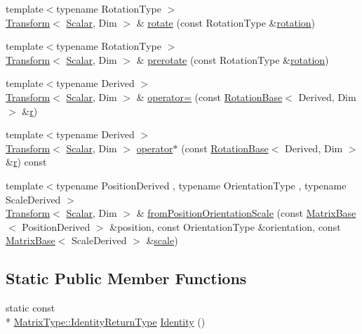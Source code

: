 \begin{DoxyCompactItemize}
\item 
{\footnotesize template$<$typename Rotation\-Type $>$ }\\\hyperlink{class_transform}{Transform}$<$ \hyperlink{class_transform_a0468fefb805493a70f2100c7faf05489}{Scalar}, Dim $>$ \& \hyperlink{class_transform_a28240ba37b1fe2b0b9bb35cd0ab73cf9}{rotate} (const Rotation\-Type \&\hyperlink{class_transform_a3d5324a4905c6c83465ae72afbdcf947}{rotation})
\item 
{\footnotesize template$<$typename Rotation\-Type $>$ }\\\hyperlink{class_transform}{Transform}$<$ \hyperlink{class_transform_a0468fefb805493a70f2100c7faf05489}{Scalar}, Dim $>$ \& \hyperlink{class_transform_a3fc8243a69cae2069870abfa76063024}{prerotate} (const Rotation\-Type \&\hyperlink{class_transform_a3d5324a4905c6c83465ae72afbdcf947}{rotation})
\item 
{\footnotesize template$<$typename Derived $>$ }\\\hyperlink{class_transform}{Transform}$<$ \hyperlink{class_transform_a0468fefb805493a70f2100c7faf05489}{Scalar}, Dim $>$ \& \hyperlink{class_transform_a0de35e40bc02a61ba5e5f22875797f9e}{operator=} (const \hyperlink{class_rotation_base}{Rotation\-Base}$<$ Derived, Dim $>$ \&\hyperlink{glext_8h_abe08814c2f72843fde4d8df41440d5a0}{r})
\item 
{\footnotesize template$<$typename Derived $>$ }\\\hyperlink{class_transform}{Transform}$<$ \hyperlink{class_transform_a0468fefb805493a70f2100c7faf05489}{Scalar}, Dim $>$ \hyperlink{class_transform_ab6230a23e5165416d718ed42abbdf1c4}{operator$\ast$} (const \hyperlink{class_rotation_base}{Rotation\-Base}$<$ Derived, Dim $>$ \&\hyperlink{glext_8h_abe08814c2f72843fde4d8df41440d5a0}{r}) const 
\item 
{\footnotesize template$<$typename Position\-Derived , typename Orientation\-Type , typename Scale\-Derived $>$ }\\\hyperlink{class_transform}{Transform}$<$ \hyperlink{class_transform_a0468fefb805493a70f2100c7faf05489}{Scalar}, Dim $>$ \& \hyperlink{class_transform_a6be2a7e5519aa1adee4d64ec68603670}{from\-Position\-Orientation\-Scale} (const \hyperlink{class_matrix_base}{Matrix\-Base}$<$ Position\-Derived $>$ \&position, const Orientation\-Type \&orientation, const \hyperlink{class_matrix_base}{Matrix\-Base}$<$ Scale\-Derived $>$ \&\hyperlink{glext_8h_a281421b881aa7a1266842b73a3bc7655}{scale})
\end{DoxyCompactItemize}
\subsection*{Static Public Member Functions}
\begin{DoxyCompactItemize}
\item 
static const \\*
\hyperlink{class_matrix_base_a2131370fa10c308c9a39fab0c81ebcd1}{Matrix\-Type\-::\-Identity\-Return\-Type} \hyperlink{class_transform_a5d1ceca3358f5c7a7cccd0e180a5d9a7}{Identity} ()
\end{DoxyCompactItemize}

